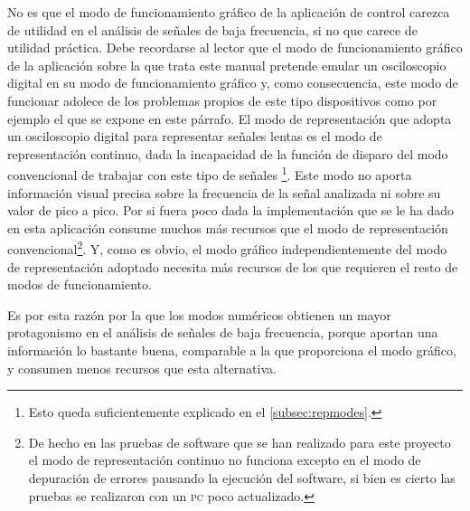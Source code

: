 No es que el modo de funcionamiento gráfico de la aplicación de control carezca de utilidad en el análisis de señales de baja frecuencia, si no que carece de utilidad práctica. Debe recordarse al lector que el modo de funcionamiento gráfico de la aplicación sobre la que trata este manual pretende emular un osciloscopio digital en su modo de funcionamiento gráfico y, como consecuencia, este modo de funcionar adolece de los problemas propios de este tipo dispositivos como por ejemplo el que se expone en este párrafo. El modo de representación que adopta un osciloscopio digital para representar señales lentas es el modo de representación continuo, dada la incapacidad de la función de disparo del modo convencional de trabajar con este tipo de señales \footnote{Esto queda suficientemente explicado en el \vref{subsec:repmodes}.}. Este modo no aporta información visual precisa sobre la frecuencia de la señal analizada ni sobre su valor de pico a pico. Por si fuera poco dada la implementación que se le ha dado en esta aplicación consume muchos más recursos que el modo de representación convencional\footnote{De hecho en las pruebas de software que se han realizado para este proyecto el modo de representación continuo no funciona excepto en el modo de depuración de errores pausando la ejecución del software, si bien es cierto las pruebas se realizaron con un \textsc{pc} poco actualizado.}. Y, como es obvio, el modo gráfico independientemente del modo de representación adoptado necesita más recursos de los que requieren el resto de modos de funcionamiento.\par
Es por esta razón por la que los modos numéricos obtienen un mayor protagonismo en el análisis de señales de baja frecuencia, porque aportan una información lo bastante buena, comparable a la que proporciona el modo gráfico, y consumen menos recursos que esta alternativa.
